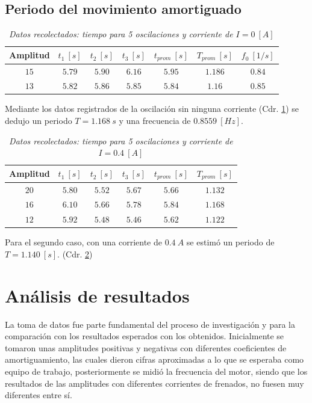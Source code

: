 \documentclass[spanish,notitlepage,letterpaper, 12pt]{article}
\begin{document}
\subsection{Periodo del movimiento amortiguado}
\begin{table}[ht]
    \centering
    \begin{tabular}{|c|c|c|c|c|c|c|}
        \hline
        \textbf{Amplitud} & $t_1 \ [s]$ & $t_2 \ [s]$ & $t_3\ [s]$ & $t_{prom}\ [s]$ & $T_{prom}\ [s]$ & $f_0\ [1/s]$\\
        \hline\hline
        $15$ & $5.79$ & $5.90$ & $6.16$ & $5.95$ & $1.186$ & $0.84$\\
        $13$ & $5.82$ & $5.86$ & $5.85$ & $5.84$ & $1.16$ & $0.85$\\
        \hline
    \end{tabular}
    \caption{\textit{Datos recolectados: tiempo para 5 oscilaciones y corriente de $I=0\ [A]$}}
    \label{Table 2}
\end{table}
Mediante los datos registrados de la oscilación sin ninguna corriente (Cdr. \ref{Table 2}) se dedujo un periodo $T=1.168\ s$ y una frecuencia de $0.8559\ [Hz]$.
\begin{table}[ht]
    \centering
    \begin{tabular}{|c|c|c|c|c|c|}
        \hline
        \textbf{Amplitud} & $t_1 \ [s]$ & $t_2 \ [s]$ & $t_3\ [s]$ & $t_{prom}\ [s]$ & $T_{prom}\ [s]$\\
        \hline\hline
        $20$ & $5.80$ & $5.52$ & $5.67$ & $5.66$ & $1.132$\\
        $16$ & $6.10$ & $5.66$ & $5.78$ & $5.84$ & $1.168$\\
        $12$ & $5.92$ & $5.48$ & $5.46$ & $5.62$ & $1.122$\\
        \hline
    \end{tabular}
    \caption{\textit{Datos recolectados: tiempo para 5 oscilaciones y corriente de $I=0.4\ [A]$}}
    \label{Table 3}
\end{table}
Para el segundo caso, con una corriente de $0.4\ A$ se estimó un periodo de $T=1.140\ [s]$. (Cdr. \ref{Table 3})
\section{Análisis de resultados}
La toma de datos fue parte fundamental del proceso de investigación y para la comparación con los resultados esperados con los obtenidos. Inicialmente se tomaron unas amplitudes positivas y negativas con diferentes coeficientes de amortiguamiento, las cuales dieron cifras aproximadas a lo que se
esperaba como equipo de trabajo, posteriormente se midió la frecuencia del motor, siendo que los resultados de las amplitudes con diferentes corrientes de frenados, no fuesen muy diferentes entre sí.
\end{document}
